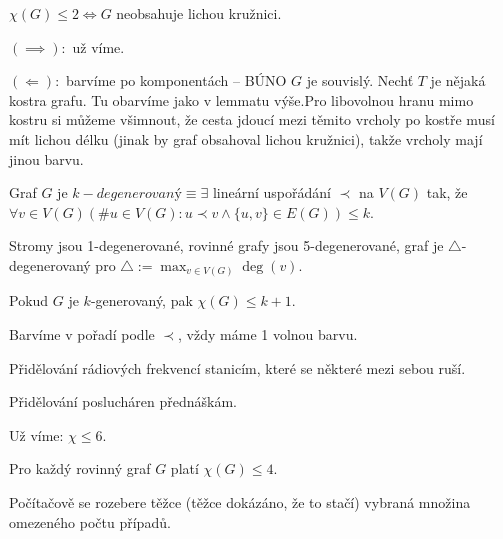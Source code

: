 \documentclass[12pt]{article}					%
\begin{document}
        \begin{veta}
            $\chi(G)≤2 \Leftrightarrow G$ neobsahuje lichou kružnici.
            \begin{dukazin}
                $(\implies):$ už víme.

                $(\Leftarrow):$ barvíme po komponentách -- BÚNO $G$ je souvislý. Nechť $T$ je nějaká kostra grafu. Tu obarvíme jako v lemmatu výše.Pro libovolnou hranu mimo kostru si můžeme všimnout, že cesta jdoucí mezi těmito vrcholy po kostře musí mít lichou délku (jinak by graf obsahoval lichou kružnici), takže vrcholy mají jinou barvu.
            \end{dukazin}
        \end{veta}

        \begin{definice}[Degenerovanost]
            Graf $G$ je $k-degenerovaný ≡ \exists$ lineární uspořádání $\prec$ na $V(G)$ tak, že $\forall v \in V(G) (\#u\in V(G): u \prec v \land \{u, v\} \in E(G)) ≤ k$.
        \end{definice}

        \begin{priklady}
                Stromy jsou 1-degenerované, rovinné grafy jsou 5-degenerované, graf je $\triangle$-degenerovaný pro $\triangle := \max_{v \in V(G)} \deg(v)$.
        \end{priklady}

        \begin{veta}[Větička]
            Pokud $G$ je $k$-generovaný, pak $\chi(G) ≤ k+1$.
            \begin{dukazin}
                Barvíme v pořadí podle $\prec$, vždy máme 1 volnou barvu.
            \end{dukazin}
        \end{veta}

        \begin{priklady}[Využití]
            Přidělování rádiových frekvencí stanicím, které se některé mezi sebou ruší.

            Přidělování poslucháren přednáškám.
        \end{priklady}

        \begin{poznamka}
            Už víme: $\chi ≤ 6$.
            \begin{vetain}[o 4 barvách]
                Pro každý rovinný graf $G$ platí $\chi(G) ≤ 4$.

                \begin{dukazin}
                    Počítačově se rozebere těžce (těžce dokázáno, že to stačí) vybraná množina omezeného počtu případů.
                \end{dukazin}
            \end{vetain}
        \end{poznamka}
\end{document}

